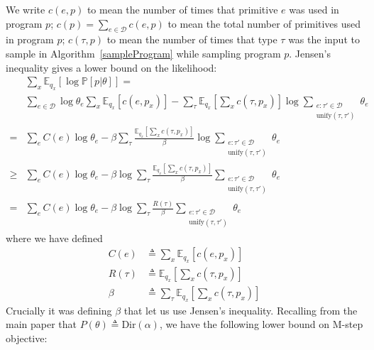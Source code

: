 \documentclass{article}
\newcommand{\expect}{\mathds{E}} %
\newcommand{\probability}{\mathds{P}} %
\begin{document}
We write $c(e,p)$ to mean the number of times that primitive $e$ was used in program $p$; $c(p)= \sum_{e\in \mathcal{D}}c(e,p)$ to mean the total number of primitives used in program $p$; $c(\tau,p)$ to mean the number of times that type $\tau$ was the input to sample in Algorithm~\ref{sampleProgram} while sampling program $p$. Jensen's inequality gives a lower bound on the likelihood:
\begin{align*}
  &\sum_x\expect_{q_x}\left[  \log \probability[p|\theta] \right] =\\
  &\sum_{e\in \mathcal{D}} \log \theta_e \sum_x\expect_{q_x}\left[c(e,p_x) \right] -
  \sum_\tau\expect_{q_x}\left[\sum_x c(\tau,p_x)  \right]\log \sum_{\substack{e:\tau'\in \mathcal{D}\\\text{unify}(\tau,\tau')}}\theta_e  \\
 =   &\sum_e C(e)\log \theta_e  - \beta\sum_\tau\frac{\expect_{q_x}\left[\sum_x c(\tau,p_x)  \right]}{\beta}\log \sum_{\substack{e:\tau'\in \mathcal{D}\\\text{unify}(\tau,\tau')}}\theta_e  \\
 \geq    &\sum_e C(e)\log \theta_e  - \beta\log \sum_\tau\frac{\expect_{q_x}\left[\sum_x c(\tau,p_x)  \right]}{\beta}\sum_{\substack{e:\tau'\in \mathcal{D}\\\text{unify}(\tau,\tau')}}\theta_e  \\
     =     &\sum_e C(e)\log \theta_e  - \beta\log \sum_\tau\frac{R(\tau)}{\beta}\sum_{\substack{e:\tau'\in \mathcal{D}\\\text{unify}(\tau,\tau')}}\theta_e  
\end{align*}
where we have defined
\begin{align*}
  C(e)&\triangleq  \sum_x\expect_{q_x}\left[c(e,p_x) \right]\\
  R(\tau)&\triangleq \expect_{q_x}\left[\sum_x c(\tau,p_x)  \right]\\
  \beta&\triangleq\sum_\tau \expect_{q_x}\left[\sum_x c(\tau,p_x)  \right]
\end{align*}
Crucially it was defining $\beta$ that let us use Jensen's inequality. 
Recalling from the main paper that $P(\theta)\triangleq\text{Dir}(\alpha)$,
we have the following lower bound on M-step objective:
\end{document}
